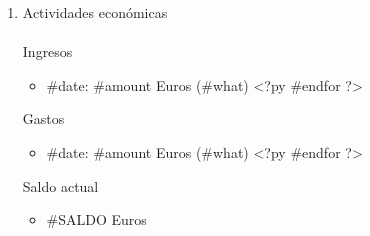 \documentclass[a4paper,12pt]{report}
\begin{document}
\begin{enumerate}
\begin{itemize}
\end{itemize}
\newpage
\item \textsf {\Large Actividades económicas}
\\
\\
\textsf{Ingresos}

\begin{itemize}
<?py for i in INGRESOS: ?>
<?py     date, amount, what = i ?>
\item #{date}: #{amount} Euros (#{what})
<?py #endfor ?>
\end{itemize}

\textsf{Gastos}

\begin{itemize}
<?py for g in GASTOS: ?>
<?py     date, amount, what = g ?>
\item #{date}: #{amount} Euros (#{what})
<?py #endfor ?>
\end{itemize}

\textsf{Saldo actual}

\begin{itemize}
\item #{SALDO} Euros
\end{itemize}


\end{enumerate}
\end{document}
